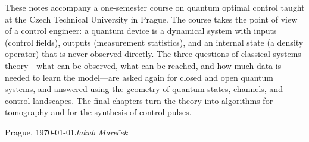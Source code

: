\documentclass[book.tex]{subfiles}
\begin{document}
\preface

These notes accompany a one-semester course on quantum optimal control taught at the Czech Technical University in Prague.
The course takes the point of view of a control engineer: a quantum device is a dynamical system with inputs (control fields), outputs (measurement statistics), and an internal state (a density operator) that is never observed directly.
The three questions of classical systems theory---what can be observed, what can be reached, and how much data is needed to learn the model---are asked again for closed and open quantum systems, and answered using the geometry of quantum states, channels, and control landscapes.
The final chapters turn the theory into algorithms for tomography and for the synthesis of control pulses.

\vspace{\baselineskip}
\begin{flushright}\noindent
Prague, \today\hfill {\it Jakub Mare{\v c}ek}
\end{flushright}
\end{document}
